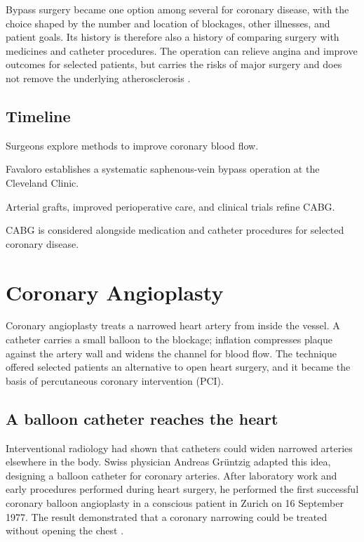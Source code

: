 \documentclass[12pt,oneside]{book}
\begin{document}
Bypass surgery became one option among several for coronary disease, with the
choice shaped by the number and location of blockages, other illnesses, and
patient goals. Its history is therefore also a history of comparing surgery
with medicines and catheter procedures. The operation can relieve angina and
improve outcomes for selected patients, but carries the risks of major surgery
and does not remove the underlying atherosclerosis
\cite{clevelandCABGHistory}.

\section*{Timeline}
\begin{description}[leftmargin=2.3cm,style=nextline]
  \item[1950s--1960s] Surgeons explore methods to improve coronary blood flow.
  \item[1967] Favaloro establishes a systematic saphenous-vein bypass operation at the Cleveland Clinic.
  \item[Late twentieth century] Arterial grafts, improved perioperative care, and clinical trials refine CABG.
  \item[Today] CABG is considered alongside medication and catheter procedures for selected coronary disease.
\end{description}
\chapter[Coronary Angioplasty]{Coronary Angioplasty}

Coronary angioplasty treats a narrowed heart artery from inside the
vessel. A catheter carries a small balloon to the blockage; inflation
compresses plaque against the artery wall and widens the channel for blood
flow. The technique offered selected patients an alternative to open
heart surgery, and it became the basis of percutaneous coronary
intervention (PCI).

\section{A balloon catheter reaches the heart}
Interventional radiology had shown that catheters could widen narrowed
arteries elsewhere in the body. Swiss physician Andreas Grüntzig adapted
this idea, designing a balloon catheter for coronary arteries. After
laboratory work and early procedures performed during heart surgery, he
performed the first successful coronary balloon angioplasty in a conscious
patient in Zurich on 16 September 1977. The result demonstrated that a
coronary narrowing could be treated without opening the chest
\cite{angioplastyHistory,gruentzigFirstPatient}.
\end{document}
